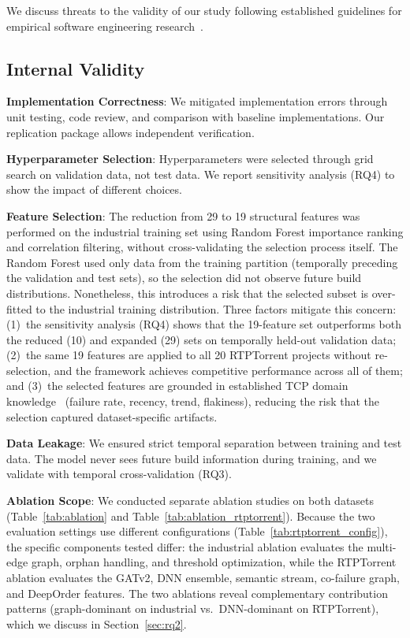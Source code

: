 
We discuss threats to the validity of our study following established guidelines
for empirical software engineering research~\cite{arcuri2011practical}.

\subsection{Internal Validity}

\textbf{Implementation Correctness}: We mitigated implementation errors through
unit testing, code review, and comparison with baseline implementations. Our
replication package allows independent verification.

\textbf{Hyperparameter Selection}: Hyperparameters were selected through grid
search on validation data, not test data. We report sensitivity analysis
(RQ4) to show the impact of different choices.

\textbf{Feature Selection}: The reduction from 29 to 19 structural features
was performed on the industrial training set using Random Forest importance
ranking and correlation filtering, without cross-validating the selection
process itself. The Random Forest used only data from the training partition
(temporally preceding the validation and test sets), so the selection did not
observe future build distributions. Nonetheless, this introduces a risk that
the selected subset is over-fitted to the industrial training distribution.
Three factors mitigate this concern: (1)~the sensitivity analysis (RQ4) shows
that the 19-feature set outperforms both the reduced (10) and expanded (29)
sets on temporally held-out validation data; (2)~the same 19 features are
applied to all 20 RTPTorrent projects without re-selection, and the framework
achieves competitive performance across all of them; and (3)~the selected
features are grounded in established TCP domain
knowledge~\cite{chen2023deeporder, kim2002history} (failure rate, recency,
trend, flakiness), reducing the risk that the selection captured
dataset-specific artifacts.

\textbf{Data Leakage}: We ensured strict temporal separation between training
and test data. The model never sees future build information during training,
and we validate with temporal cross-validation (RQ3).

\textbf{Ablation Scope}: We conducted separate ablation studies on both
datasets (Table~\ref{tab:ablation} and Table~\ref{tab:ablation_rtptorrent}).
Because the two evaluation settings use different configurations
(Table~\ref{tab:rtptorrent_config}), the specific components tested differ:
the industrial ablation evaluates the multi-edge graph, orphan handling, and
threshold optimization, while the RTPTorrent ablation evaluates the GATv2,
DNN ensemble, semantic stream, co-failure graph, and DeepOrder features.
The two ablations reveal complementary contribution patterns (graph-dominant
on industrial vs.\ DNN-dominant on RTPTorrent), which we discuss in
Section~\ref{sec:rq2}.

